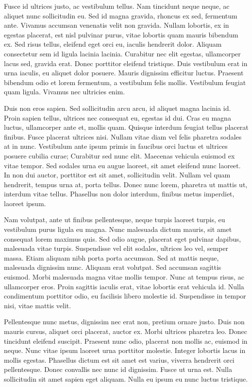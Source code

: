\documentclass{homework}
\begin{document}
Fusce id ultrices justo, ac vestibulum tellus. Nam tincidunt neque neque, ac aliquet nunc sollicitudin eu. Sed id magna gravida, rhoncus ex sed, fermentum ante. Vivamus accumsan venenatis velit non gravida. Nullam lobortis, ex in egestas placerat, est nisl pulvinar purus, vitae lobortis quam mauris bibendum ex. Sed risus tellus, eleifend eget orci eu, iaculis hendrerit dolor. Aliquam consectetur sem id ligula lacinia lacinia. Curabitur nec elit egestas, ullamcorper lacus sed, gravida erat. Donec porttitor eleifend tristique. Duis vestibulum erat in urna iaculis, eu aliquet dolor posuere. Mauris dignissim efficitur luctus. Praesent bibendum odio et lorem fermentum, a vestibulum felis mollis. Vestibulum feugiat quam ligula. Vivamus nec ultricies enim.

Duis non eros sapien. Sed sollicitudin arcu arcu, id aliquet magna lacinia id. Proin sapien tellus, ultrices nec consequat eu, egestas id dui. Cras eu magna luctus, ullamcorper ante et, mollis quam. Quisque interdum feugiat tellus placerat finibus. Fusce placerat ultrices nisi. Nullam vitae diam vel felis pharetra sodales at in nunc. Vestibulum ante ipsum primis in faucibus orci luctus et ultrices posuere cubilia curae; Curabitur sed nunc elit. Maecenas vehicula euismod ex vitae tempor. Sed sodales urna eu augue laoreet, sit amet eleifend nunc laoreet. In non dui auctor, porttitor est sit amet, sollicitudin velit. Nullam vel quam hendrerit, tempus urna at, porta tellus. Donec nunc lorem, pharetra ut mattis ut, interdum vitae tellus. Phasellus non dolor interdum, finibus metus imperdiet, laoreet ipsum.

Nam volutpat, ante ut finibus pellentesque, neque turpis laoreet turpis, eu vestibulum purus ligula eu magna. Nunc malesuada dictum mauris, sit amet consequat lorem maximus quis. Sed odio augue, placerat eget pulvinar dapibus, malesuada vitae turpis. Suspendisse vel elit sodales, ultrices leo vel, semper massa. Etiam aliquam nibh porta porta accumsan. Sed at mattis neque, malesuada dignissim nunc. Aliquam erat volutpat. Sed accumsan sagittis euismod. Morbi malesuada magna vitae mollis tempor. Nunc at tempus risus, ac ullamcorper eros. Proin sagittis iaculis erat, vitae lobortis erat vehicula id. Nulla condimentum porttitor odio, eu facilisis libero molestie id. Suspendisse in tempor nisi, vitae mattis velit.

Pellentesque nunc metus, dignissim nec erat non, pretium ornare justo. Duis non mauris cursus, aliquet orci placerat, auctor ex. Morbi ultrices pharetra leo. Donec tincidunt eleifend suscipit. Praesent nunc odio, placerat non mollis ac, euismod in neque. Nunc vitae ipsum laoreet urna porttitor molestie. Integer lobortis lacus in mollis egestas. Phasellus dictum est sit amet est varius, viverra hendrerit orci pellentesque. Donec convallis nec nunc id dignissim. Fusce ut urna est. Nulla sollicitudin sit amet sapien eget aliquam. Nulla eu ipsum eu nunc luctus tristique.
\end{document}
